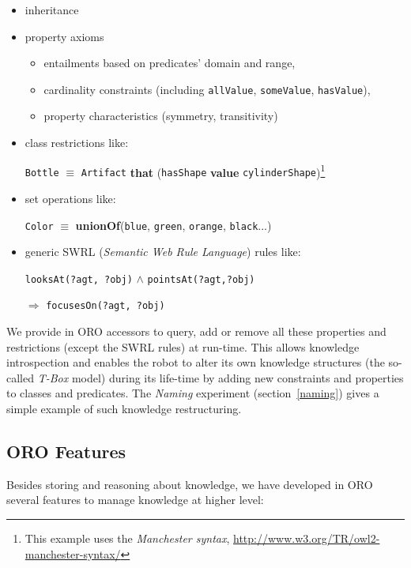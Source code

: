 \documentclass{svmult}
\newcommand{\concept}[1]{{\footnotesize \texttt{#1}}}
\begin{document}
\begin{itemize}
	\item inheritance
	\item property axioms
		\begin{itemize}
		\item entailments based on predicates' domain and range,
		\item cardinality constraints (including \concept{allValue}, 
		\concept{someValue}, \concept{hasValue}),
		\item property characteristics (symmetry, transitivity)
		\end{itemize}
	\item class restrictions like: \par \footnotesize \concept{Bottle} $\equiv$
		\concept{Artifact} {\bf that} (\concept{hasShape} {\bf value}
		\concept{cylinderShape})\footnote{This example uses the \emph{Manchester
		syntax}, \url{http://www.w3.org/TR/owl2-manchester-syntax/}} \normalsize
	\item set operations like: \par \footnotesize \concept{Color} $\equiv$ {\bf unionOf}(\concept{blue},
		\concept{green}, \concept{orange}, \concept{black}...) \normalsize
	\item generic SWRL ({\em Semantic Web Rule Language}) rules like: \par
		\footnotesize \concept{looksAt(?agt, ?obj)} $\land$
		\concept{pointsAt(?agt,?obj)} \par $\Rightarrow$ \concept{focusesOn(?agt, ?obj)}
		\normalsize 
	\end{itemize}

We provide in ORO accessors to query, add or remove all these properties and
restrictions (except the SWRL rules) at run-time. This allows
knowledge introspection and enables the robot to alter its own knowledge
structures (the so-called \emph{T-Box} model) during its life-time by adding
new constraints and properties to classes and predicates.
The \emph{Naming} experiment (section~\ref{naming}) gives a simple example of
such knowledge restructuring.

\subsection{ORO Features}
\label{features}

Besides storing and reasoning about knowledge, we have developed in ORO several
features to manage knowledge at higher level: 
\end{document}
